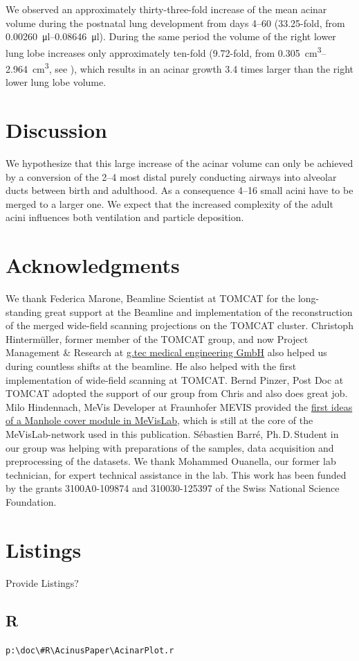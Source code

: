\documentclass[%
	paper=a4,%
	twoside=true,%
	draft=false,%
	abstract=false]{scrartcl}
\begin{document}
We observed an approximately thirty-three-fold increase of the mean acinar volume during the postnatal lung development from days \numrange{4}{60} (33.25-fold, from \SIrange{0.00260}{0.08646}{\micro\litre}). During the same period the volume of the right lower lung lobe increases only approximately ten-fold (9.72-fold, from \SIrange{0.305}{2.964}{\centi\metre\cubed}, see \cite{Tschanz2003}), which results in an acinar growth 3.4 times larger than the right lower lung lobe volume.

\section{Discussion}\label{sec:Discussion}
We hypothesize that this large increase of the acinar volume can only be achieved by a conversion of the \numrange{2}{4} most distal purely conducting airways into alveolar ducts between birth and adulthood. As a consequence \numrange{4}{16} small acini have to be merged to a larger one. We expect that the increased complexity of the adult acini influences both ventilation and particle deposition.

\section{Acknowledgments}
We thank Federica Marone, Beamline Scientist at TOMCAT for the long-standing great support at the Beamline and implementation of the reconstruction of the merged wide-field scanning projections on the TOMCAT cluster. Christoph Hinterm\"{u}ller, former member of the TOMCAT group, and now Project Management \& Research at \href{http://gtec.at/}{g.tec medical engineering GmbH} also helped us during countless shifts at the beamline. He also helped with the first implementation of wide-field scanning at TOMCAT. Bernd Pinzer, Post Doc at TOMCAT adopted the support of our group from Chris and also does great job. Milo Hindennach, MeVis Developer at Fraunhofer MEVIS provided the \href{http://www.mevis-research.de/cgi-bin/discus/board-auth.cgi?lm=1282233250&file=/839/11760.html}{first ideas of a Manhole cover module in MeVisLab}, which is still at the core of the MeVisLab-network used in this publication. Sébastien Barré, Ph.\,D.\,Student in our group was helping with preparations of the samples, data acquisition and preprocessing of the datasets. We thank Mohammed Ouanella, our former lab technician, for expert technical assistance in the lab. This work has been funded by the grants 3100A0-109874 and 310030-125397  of the Swiss National Science Foundation.




\appendix
\section{Listings}
Provide Listings?
\subsection{R}
\verb+p:\doc\#R\AcinusPaper\AcinarPlot.r+
 
\end{document}
